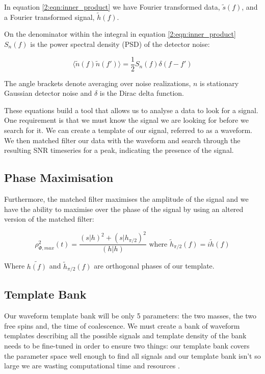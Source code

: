 In equation \ref{2:eqn:inner_product} we have Fourier transformed data, $\tilde{s}(f)$, and a Fourier transformed signal, $\tilde{h}(f)$.

On the denominator within the integral in equation \ref{2:eqn:inner_product} $S_n(f)$ is the power spectral density (PSD) of the detector noise:

\begin{equation}
   \langle \tilde{n}(f) \tilde{n}(f') \rangle = \frac{1}{2} S_n(f) \delta(f-f')
   \label{2:eqn:PSD}
\end{equation}

The angle brackets denote averaging over noise realizations, $n$ is stationary Gaussian detector noise and $\delta$ is the Dirac delta function.

These equations build a tool that allows us to analyse a data to look for a signal. One requirement is that we must know the signal we are looking for before we search for it. We can create a template of our signal, referred to as a waveform. We then matched filter our data with the waveform and search through the resulting SNR timeseries for a peak, indicating the presence of the signal.

\subsection{\label{2:sec:phase-maximisation}Phase Maximisation}

Furthermore, the matched filter maximises the amplitude of the \gw signal and we have the ability to maximise over the phase of the signal by using an altered version of the matched filter:

\begin{equation}
   \text{$\rho^2_{\Phi,max}(t) = \frac{(s|h)^2 + (s|h_{\pi/2})^2}{(h|h)}$ where $\tilde{h}_{\pi/2}(f) = i \tilde{h}(f)$}
   \label{2:eqn:phase_mf}
\end{equation}

Where $\tilde{h(f)}$ and $\tilde{h}_{\pi/2}(f)$ are orthogonal phases of our template.

\subsection{\label{2:sec:template-bank}Template Bank}

Our waveform template bank will be only 5 parameters: the two masses, the two free spins and, the time of coalescence. We must create a bank of waveform templates describing all the possible signals and template density of the bank needs to be fine-tuned in order to ensure two things: our template bank covers the parameter space well enough to find all signals and our template bank isn't so large we are wasting computational time and resources \cite{Owen_Sathya:1999}.

